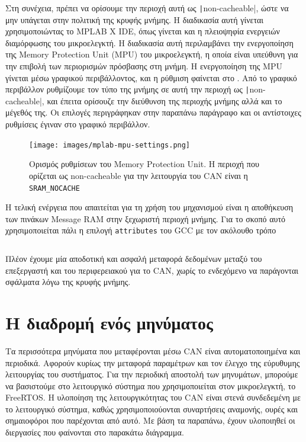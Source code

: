 \documentclass[a4paper,nobib,justified]{tufte-book}
\begin{document}
Στη συνέχεια, πρέπει να ορίσουμε την περιοχή αυτή ως \texttt|non-cacheable|, ώστε να μην υπάγεται στην πολιτική της κρυφής μνήμης. Η διαδικασία αυτή γίνεται χρησιμοποιώντας το MPLAB X IDE, όπως γίνεται και η πλειοψηφία ενεργειών διαμόρφωσης του μικροελεγκτή. Η διαδικασία αυτή περιλαμβάνει την ενεργοποίηση της Memory Protection Unit (MPU) του μικροελεγκτή, η οποία είναι υπεύθυνη για την επιβολή των περιορισμών πρόσβασης στη μνήμη. Η ενεργοποίηση της MPU γίνεται μέσω γραφικού περιβάλλοντος, και η ρύθμιση φαίνεται στο . Από το γραφικό περιβάλλον ρυθμίζουμε τον τύπο της μνήμης σε αυτή την περιοχή ως \texttt|non-cacheable|, και έπειτα ορίσουζε την διεύθυνση της περιοχής μνήμης αλλά και το μέγεθός της. Οι επιλογές περιγράφηκαν στην παραπάνω παράγραφο και οι αντίστοιχες ρυθμίσεις έγιναν στο γραφικό περιβάλλον.

\begin{figure}
	\texttt{[image: images/mplab-mpu-settings.png]}
	\label{fig:mpu-settings}
	\caption[Ορισμός ρυθμίσεων της MPU]{Ορισμός ρυθμίσεων του Memory Protection Unit. Η περιοχή που ορίζεται ως non-cacheable για την λειτουργία του CAN είναι η \texttt{SRAM\_NOCACHE}}
\end{figure}

Η τελική ενέργεια που απαιτείται για τη χρήση του μηχανισμού είναι η αποθήκευση των πινάκων Message RAM στην ξεχωριστή περιοχή μνήμης. Για το σκοπό αυτό χρησιμοποιείται πάλι η επιλογή \texttt{attributes} του GCC με τον ακόλουθο τρόπο \inputminted{c++}{code/examples/message-ram/full.cpp}

Πλέον έχουμε μία αποδοτική και ασφαλή μεταφορά δεδομένων μεταξύ του επεξεργαστή και του περιφερειακού για το CAN, χωρίς το ενδεχόμενο να παράγονται σφάλματα λόγω της κρυφής μνήμης.

\clearpage
\section{Η διαδρομή ενός μηνύματος}

Τα περισσότερα μηνύματα που μεταφέρονται μέσω CAN είναι αυτοματοποιημένα και περιοδικά. Αφορούν κυρίως την μεταφορά παραμέτρων και τον έλεγχο της εύρυθυμης λειτουργίας του συστήματος. Για την περιοδική αποστολή των μηνυμάτων, μπορούμε να βασιστούμε στο λειτουργικό σύστημα που χρησιμοποιείται στον μικροελεγκτή, το FreeRTOS. Η υλοποίηση της λειτουργικότητας του CAN είναι στενά συνδεδεμένη με το λειτουργικό σύστημα, καθώς χρησιμοποιούονται συναρτήσεις αναμονής, ουρές και σημαιοφόροι που παρέχονται από αυτό. Με βάση τα παραπάνω, έχουν υλοποιηθεί οι διεργασίες που φαίνονται στο παρακάτω διάγραμμα.
\end{document}
